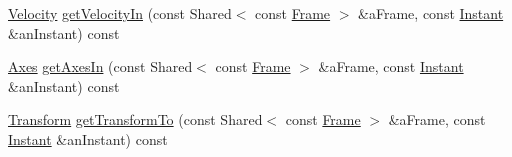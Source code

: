 \begin{DoxyCompactItemize}
\item 
\hyperlink{classostk_1_1physics_1_1coord_1_1_velocity}{Velocity} \hyperlink{classostk_1_1physics_1_1coord_1_1_frame_ab2d8bdcd3f68604d4ca104341f51b7f1}{get\+Velocity\+In} (const Shared$<$ const \hyperlink{classostk_1_1physics_1_1coord_1_1_frame}{Frame} $>$ \&a\+Frame, const \hyperlink{classostk_1_1physics_1_1time_1_1_instant}{Instant} \&an\+Instant) const
\item 
\hyperlink{classostk_1_1physics_1_1coord_1_1_axes}{Axes} \hyperlink{classostk_1_1physics_1_1coord_1_1_frame_ac75780963694dd74ea2e6a66f6ae17d8}{get\+Axes\+In} (const Shared$<$ const \hyperlink{classostk_1_1physics_1_1coord_1_1_frame}{Frame} $>$ \&a\+Frame, const \hyperlink{classostk_1_1physics_1_1time_1_1_instant}{Instant} \&an\+Instant) const
\item 
\hyperlink{classostk_1_1physics_1_1coord_1_1_transform}{Transform} \hyperlink{classostk_1_1physics_1_1coord_1_1_frame_aa6f51c81724f36644ad8343a1124c264}{get\+Transform\+To} (const Shared$<$ const \hyperlink{classostk_1_1physics_1_1coord_1_1_frame}{Frame} $>$ \&a\+Frame, const \hyperlink{classostk_1_1physics_1_1time_1_1_instant}{Instant} \&an\+Instant) const
\end{DoxyCompactItemize}
